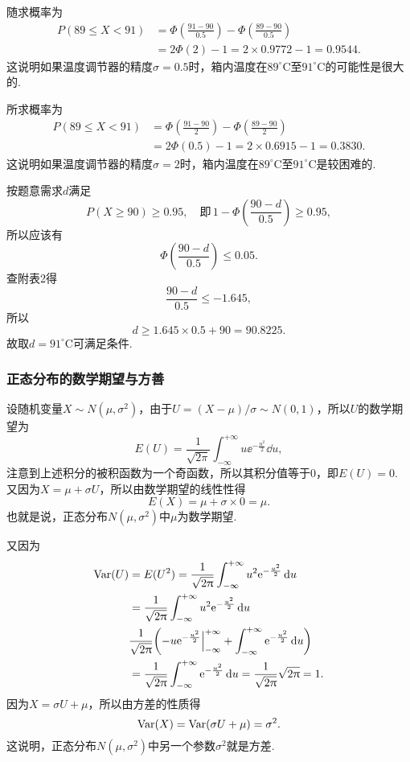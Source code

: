 \begin{solution}
  \begin{inparaenum}[(1)]
    \item 随求概率为
    \begin{align*}
      P(89 \le X <91) & = \varPhi\left( \frac{91-90}{0.5} \right) - \varPhi\left( \frac{89-90}{0.5} \right) \\
      & = 2\varPhi(2) - 1 = 2\times0.9772 - 1 = 0.9544.
    \end{align*}
    这说明如果温度调节器的精度$\sigma=0.5$时，箱内温度在$89^\circ\mathrm C$至$91^\circ\mathrm C$的可能性是很大的.

    \item 所求概率为
    \begin{align*}
      P(89 \le X <91) & = \varPhi\left( \frac{91-90}2 \right) - \varPhi\left( \frac{89-90}2 \right) \\
      & = 2\varPhi(0.5) - 1 = 2\times0.6915 - 1 = 0.3830.
    \end{align*}
    这说明如果温度调节器的精度$\sigma=2$时，箱内温度在$89^\circ\mathrm C$至$91^\circ\mathrm C$是较困难的.

    \item 按题意需求$d$满足
    \[
      P(X \ge 90) \ge 0.95,\quad \text{即}\, 1 - \varPhi\left( \frac{90-d}{0.5} \right) \ge 0.95,
    \]
    所以应该有
    \[
      \varPhi\left( \frac{90-d}{0.5} \right) \le 0.05.
    \]
    查附表2得
    \[
      \frac{90 - d}{0.5} \le -1.645,
    \]
    所以
    \[
      d \ge 1.645 \times 0.5 + 90 = 90.8225.
    \]
    故取$d=91^\circ\mathrm C$可满足条件.
  \end{inparaenum}
\end{solution}

\subsubsection{正态分布的数学期望与方善}
设随机变量$X\sim N(\mu,\sigma^2)$，由于$U=(X-\mu)/\sigma\sim N(0,1)$，所以$U$的数学期望为
\[
  E(U) = \frac1{\sqrt{2\pi}}\int_{-\infty}^{+\infty}
  u \ee^{-\frac{u^2}2}\dd u ,
\]
注意到上述积分的被积函数为一个奇函数，所以其积分值等于0，即$E(U)=0$. 又因为$X=\mu+\sigma U$，所以由数学期望的线性性得
\[
  E(X) = \mu + \sigma \times 0 = \mu.
\]
也就是说，正态分布$N(\mu,\sigma^2)$中$\mu$为数学期望.

又因为
\begin{align*}
  \Var(U) & = E(U^2) = \frac1{\sqrt{2\pi}}\int_{-\infty}^{+\infty}
  u^2 \ee^{-\frac{u^2}2}\dd u \\
  & = \frac1{\sqrt{2\pi}}\int_{-\infty}^{+\infty}
  u^2 \ee^{-\frac{u^2}2}\dd u \\
  & \frac1{\sqrt{2\pi}} \left( -u\ee^{-\frac{u^2}2}\Big|_{-\infty}^{+\infty}
  + \int_{-\infty}^{+\infty}\ee^{-\frac{u^2}2} \dd u \right) \\
  & = \frac1{\sqrt{2\pi}}\int_{-\infty}^{+\infty}
   \ee^{-\frac{u^2}2}\dd u = \frac1{\sqrt{2\pi}} \sqrt{2\pi} = 1.
\end{align*}
因为$X=\sigma U+\mu$，所以由方差的性质得
\[
  \operatorname{Var}(X) = \operatorname{Var}(\sigma U + \mu) = \sigma^2.
\]
这说明，正态分布$N(\mu,\sigma^2)$中另一个参数$\sigma^2$就是方差.

